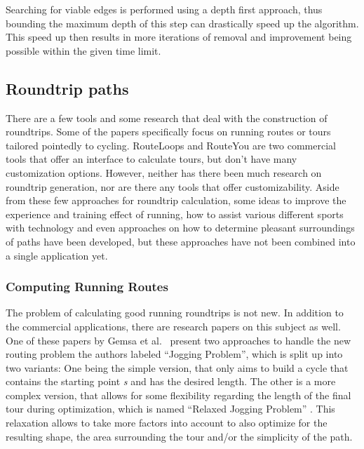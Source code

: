Searching for viable edges is performed using a depth first approach, thus bounding the maximum depth of this step can drastically speed up the algorithm.
This speed up then results in more iterations of removal and improvement being possible within the given time limit.



\subsection{Roundtrip paths}
\label{subsec:Roudtrip}
There are a few tools and some research that deal with the construction of roundtrips.
Some of the papers specifically focus on running routes or tours tailored pointedly to cycling.
RouteLoops and RouteYou are two commercial tools that offer an interface to calculate tours, but don't have many customization options.
However, neither has there been much research on roundtrip generation, nor are there any tools that offer customizability.
Aside from these few approaches for roundtrip calculation, some ideas to improve the experience and training effect of running, how to assist various different sports with technology and even approaches on how to determine pleasant surroundings of paths have been developed, but these approaches have not been combined into a single application yet.



\subsubsection{Computing Running Routes}
\label{subsubsec:runningRoutes}

The problem of calculating good running roundtrips is not new.
In addition to the commercial applications, there are research papers on this subject as well.
One of these papers by Gemsa et al.\ \cite{gemsa_efficient_2013} present two approaches to handle the new routing problem the authors labeled \enquote{Jogging Problem}, which is split up into two variants: 
One being the simple version, that only aims to build a cycle that contains the starting point \textit{s} and has the desired length.
The other is a more complex version, that allows for some flexibility regarding the length of the final tour during optimization, which is named \enquote{Relaxed Jogging Problem} \cite{gemsa_efficient_2013}. 
This relaxation allows to take more factors into account to also optimize for the resulting shape, the area surrounding the tour and/or the simplicity of the path. 

